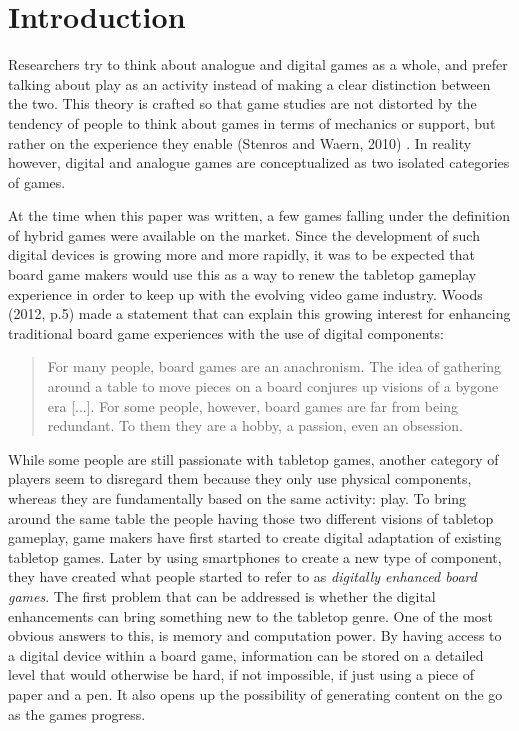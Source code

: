 \chapter{Introduction}
Researchers try to think about analogue and digital games as a whole, and prefer talking about play as an activity instead of making a clear distinction between the two. This theory is crafted so that game studies are not distorted by the tendency of people to think about games in terms of mechanics or support, but rather on the experience they enable (Stenros and Waern, 2010) \cite{art:stenroswaern}. In reality however, digital and analogue games are conceptualized as two isolated categories of games.

At the time when this paper was written, a few games falling under the definition of hybrid games were available on the market. Since the development of such digital devices is growing more and more rapidly, it was to be expected that board game makers would use this as a way to renew the tabletop gameplay experience in order to keep up with the evolving video game industry. Woods (2012, p.5) \cite{book:euro} made a statement that can explain this growing interest for enhancing traditional board game experiences with the use of digital components:

\begin{quotation}
For many people, board games are an anachronism. The idea of gathering around a table to move pieces on a board conjures up visions of a bygone era [...]. For some people, however, board games are far from being redundant. To them they are a hobby, a passion, even an obsession.
\end{quotation}

While some people are still passionate with tabletop games, another category of players seem to disregard them because they only use physical components, whereas they are fundamentally based on the same activity: play. To bring around the same table the people having those two different visions of tabletop gameplay, game makers have first started to create digital adaptation of existing tabletop games. Later by using smartphones to create a new type of component, they have created what people started to refer to as \textit{digitally enhanced board games}. The first problem that can be addressed is whether the digital enhancements can bring something new to the tabletop genre. One of the most obvious answers to this, is memory and computation power. By having access to a digital device within a board game, information can be stored on a detailed level that would otherwise be hard, if not impossible, if just using a piece of paper and a pen. 
It also opens up the possibility of generating content on the go as the games progress. 

